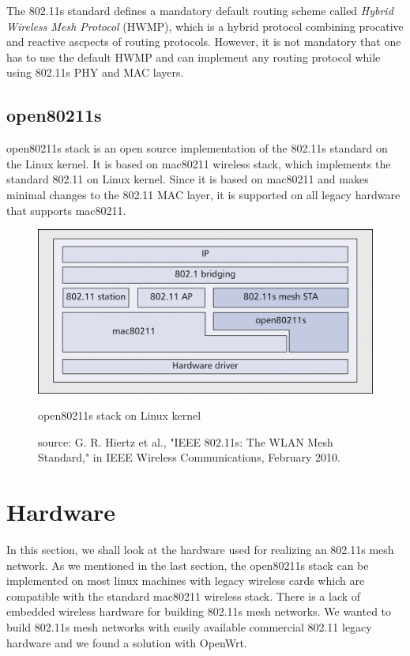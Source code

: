 The 802.11s standard defines a mandatory default routing scheme called \textit{Hybrid Wireless Mesh Protocol} (HWMP), which is a hybrid protocol combining procative and reactive ascpects of routing protocols. However, it is not mandatory that one has to use the default HWMP and can implement any routing protocol while using 802.11s PHY and MAC layers.

\subsection{open80211s}
open80211s stack is an open source implementation of the 802.11s standard on the Linux kernel. It is based on mac80211 wireless stack, which implements the standard 802.11 on Linux kernel. Since it is based on mac80211 and makes minimal changes to the 802.11 MAC layer, it is supported on all legacy hardware that supports mac80211.

\begin{figure}
	\centering
	\includegraphics[scale=0.3]{Pictures/open80211s.png}
	\caption{open80211s stack on Linux kernel}
	\label{fig: open80211s}
	\caption*{source: G. R. Hiertz et al., "IEEE 802.11s: The WLAN Mesh Standard," in IEEE Wireless Communications, February 2010.}
\end{figure}

\section{Hardware}
In this section, we shall look at the hardware used for realizing an 802.11s mesh network. As we mentioned in the last section, the open80211s stack can be implemented on most linux machines with legacy wireless cards which are compatible with the standard mac80211 wireless stack. There is a lack of embedded wireless hardware for building 802.11s mesh networks. We wanted to build 802.11s mesh networks with easily available commercial 802.11 legacy hardware and we found a solution with OpenWrt.

